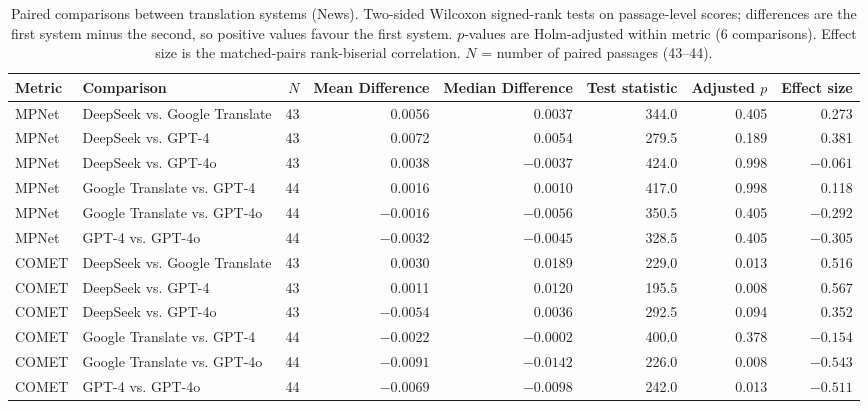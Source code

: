 \begin{table}[htbp]
\centering
\caption{Paired comparisons between translation systems (News). Two-sided Wilcoxon signed-rank tests on passage-level scores; differences are the first system minus the second, so positive values favour the first system. $p$-values are Holm-adjusted within metric (6 comparisons). Effect size is the matched-pairs rank-biserial correlation. $N$ = number of paired passages (43--44).}
\label{tab:paired_tests_news}
\small
\begin{tabular}{llrrrrrr}
\hline
\textbf{Metric} & \textbf{Comparison} & \textbf{$N$} & \textbf{Mean Difference} & \textbf{Median Difference} & \textbf{Test statistic} & \textbf{Adjusted $p$} & \textbf{Effect size} \\
\hline
MPNet & DeepSeek vs. Google Translate & 43 & 0.0056 & 0.0037 & 344.0 & 0.405 & 0.273 \\
MPNet & DeepSeek vs. GPT-4 & 43 & 0.0072 & 0.0054 & 279.5 & 0.189 & 0.381 \\
MPNet & DeepSeek vs. GPT-4o & 43 & 0.0038 & $-0.0037$ & 424.0 & 0.998 & $-0.061$ \\
MPNet & Google Translate vs. GPT-4 & 44 & 0.0016 & 0.0010 & 417.0 & 0.998 & 0.118 \\
MPNet & Google Translate vs. GPT-4o & 44 & $-0.0016$ & $-0.0056$ & 350.5 & 0.405 & $-0.292$ \\
MPNet & GPT-4 vs. GPT-4o & 44 & $-0.0032$ & $-0.0045$ & 328.5 & 0.405 & $-0.305$ \\
COMET & DeepSeek vs. Google Translate & 43 & 0.0030 & 0.0189 & 229.0 & 0.013 & 0.516 \\
COMET & DeepSeek vs. GPT-4 & 43 & 0.0011 & 0.0120 & 195.5 & 0.008 & 0.567 \\
COMET & DeepSeek vs. GPT-4o & 43 & $-0.0054$ & 0.0036 & 292.5 & 0.094 & 0.352 \\
COMET & Google Translate vs. GPT-4 & 44 & $-0.0022$ & $-0.0002$ & 400.0 & 0.378 & $-0.154$ \\
COMET & Google Translate vs. GPT-4o & 44 & $-0.0091$ & $-0.0142$ & 226.0 & 0.008 & $-0.543$ \\
COMET & GPT-4 vs. GPT-4o & 44 & $-0.0069$ & $-0.0098$ & 242.0 & 0.013 & $-0.511$ \\
\hline
\end{tabular}
\end{table}
